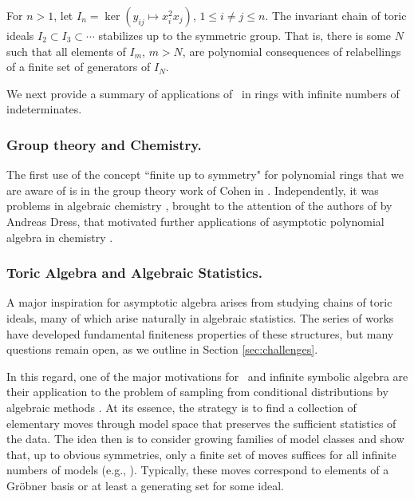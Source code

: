 \begin{theorem}\label{monomthm}
For $n > 1$, let $I_n = \ker (y_{ij} \mapsto x_i^2 x_j)$, $1 \leq i \neq j \leq n$.  The invariant chain of toric ideals $I_2 \subset I_3 \subset \cdots$ stabilizes up to the symmetric group.  That is, there is some $N$ such that all elements of $I_m$, $m > N$, are polynomial consequences of relabellings of a finite set of generators of $I_N$.
\end{theorem}


We next provide a summary of applications of \EGBs\ in rings with infinite numbers of indeterminates.  

\subsubsection{Group theory and Chemistry.}

The first use of the concept ``finite up to symmetry" for polynomial rings that we are aware of is in the group theory work of Cohen in \cite{cohen1967laws}.  
Independently, it was problems in algebraic chemistry \cite{ruch1967vandermondesche}, brought to the attention of the authors of \cite{aschenbrenner2007finite} by Andreas Dress, that motivated further applications of asymptotic polynomial algebra in chemistry \cite{Draisma08b}.

\subsubsection{Toric Algebra and Algebraic Statistics.}

A major inspiration for asymptotic algebra arises from studying chains of toric ideals, many of which arise naturally in algebraic statistics.  The series of works \cite{Hillar13, hillar2016corrigendum, draisma2013noetherianity, KKL:equivariant-markov, Krone:egb-toric} have developed fundamental finiteness properties of these structures, but many questions remain open, as we outline in Section \ref{sec:challenges}.  

In this regard, one of the major motivations for \EGBs\ and infinite symbolic algebra are their application to the problem of sampling from conditional distributions by algebraic methods \cite{diaconis1998algebraic}.  At its essence, the strategy is to find a collection of elementary moves through model space that preserves the sufficient statistics of the data.   The idea then is to consider growing families of model classes and show that, up to obvious symmetries, only a finite set of moves suffices for all infinite numbers of models (e.g., \cite{aoki2003minimal, santos2003higher, hocsten2007finiteness, drton2007algebraic, Draisma08b, Brouwer09e, draisma2009ideals, hillar2012finite, draisma2015finiteness}).  Typically, these moves correspond to elements of a Gr\"obner basis or at least a generating set for some ideal.

